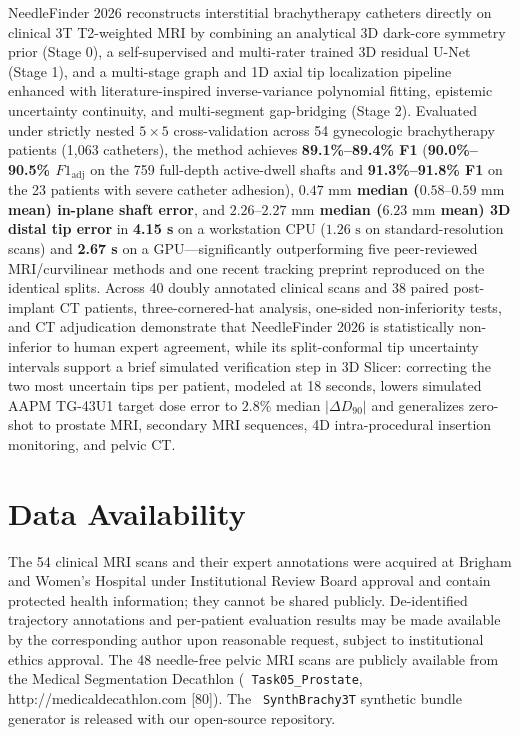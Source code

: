 \documentclass[
  11pt,
]{article}
\let\nforigtexttt\texttt
\renewcommand{\texttt}[1]{\nforigtexttt{\XeTeXinterchartokenstate=1 #1}}
\begin{document}
NeedleFinder 2026 reconstructs interstitial brachytherapy catheters
directly on clinical 3T T2-weighted MRI by combining an analytical 3D
dark-core symmetry prior (Stage 0), a self-supervised and multi-rater
trained 3D residual U-Net (Stage 1), and a multi-stage graph and 1D
axial tip localization pipeline enhanced with literature-inspired
inverse-variance polynomial fitting, epistemic uncertainty continuity,
and multi-segment gap-bridging (Stage 2). Evaluated under strictly
nested \(5 \times 5\) cross-validation across 54 gynecologic
brachytherapy patients (1,063 catheters), the method achieves
\textbf{89.1\%--89.4\% F1} (\textbf{90.0\%--90.5\% \(F1_{\text{adj}}\)}
on the 759 full-depth active-dwell shafts and \textbf{91.3\%--91.8\% F1}
on the 23 patients with severe catheter adhesion),
\textbf{\(0.47\text{ mm}\) median (\(0.58\text{--}0.59\text{ mm}\) mean)
in-plane shaft error}, and \textbf{\(2.26\text{--}2.27\text{ mm}\)
median (\(6.23\text{ mm}\) mean) 3D distal tip error} in \textbf{4.15 s}
on a workstation CPU (\(1.26\text{ s}\) on standard-resolution scans)
and \textbf{2.67 s} on a GPU---significantly outperforming five
peer-reviewed MRI/curvilinear methods and one recent tracking preprint
reproduced on the identical splits. Across 40 doubly annotated clinical
scans and 38 paired post-implant CT patients, three-cornered-hat
analysis, one-sided non-inferiority tests, and CT adjudication
demonstrate that NeedleFinder 2026 is statistically non-inferior to
human expert agreement, while its split-conformal tip uncertainty
intervals support a brief simulated verification step in 3D Slicer:
correcting the two most uncertain tips per patient, modeled at 18
seconds, lowers simulated AAPM TG-43U1 target dose error to \(2.8\%\)
median \(|\Delta D_{90}|\) and generalizes zero-shot to prostate MRI,
secondary MRI sequences, 4D intra-procedural insertion monitoring, and
pelvic CT.

\FloatBarrier

\section*{Data Availability}\label{data-availability}

The 54 clinical MRI scans and their expert annotations were acquired at
Brigham and Women's Hospital under Institutional Review Board approval
and contain protected health information; they cannot be shared
publicly. De-identified trajectory annotations and per-patient
evaluation results may be made available by the corresponding author
upon reasonable request, subject to institutional ethics approval. The
48 needle-free pelvic MRI scans are publicly available from the Medical
Segmentation Decathlon (\texttt{Task05\_Prostate},
http://medicaldecathlon.com {[}80{]}). The \texttt{SynthBrachy3T}
synthetic bundle generator is released with our open-source repository.
\end{document}
